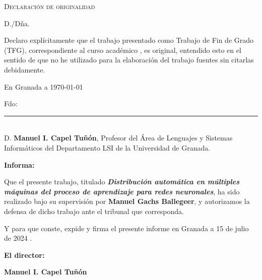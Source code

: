 %

\thispagestyle{empty}

\hfill\vfill

\textsc{Declaración de originalidad}\\\bigskip

D./Dña. \miNombre \\\medskip

Declaro explícitamente que el trabajo presentado como Trabajo de Fin de Grado (TFG), correspondiente al curso académico \miCurso, es original, entendido esto en el sentido de que no he utilizado para la elaboración del trabajo fuentes sin citarlas debidamente.
\medskip

En Granada a \today 
\vspace{3cm}
\begin{center} 
Fdo: \miNombre 

\end{center}

\vfill

\cleardoublepage

\newpage
\thispagestyle{empty}

\noindent\rule[-1ex]{\textwidth}{2pt}\\[4.5ex]

D. \textbf{Manuel I. Capel Tuñón}, Profesor del Área de Lenguajes y Sistemas Informáticos del Departamento LSI de la Universidad de Granada.

\vspace{0.5cm}



\textbf{Informa:}

\vspace{0.5cm}

Que el presente trabajo, titulado \textit{\textbf{Distribución automática en múltiples máquinas del proceso de aprendizaje para redes neuronales}}, ha sido realizado bajo su supervisión por \textbf{Manuel Gachs Ballegeer}, y autorizamos la defensa de dicho trabajo ante el tribunal que corresponda.

\vspace{0.5cm}

Y para que conste, expide y firma el presente informe en Granada a  15 de julio de 2024 .

\vspace{1cm}

\textbf{El director:}

\vspace{5cm}

\noindent \textbf{Manuel I. Capel Tuñón \ \ \ \ \ }



\endinput
